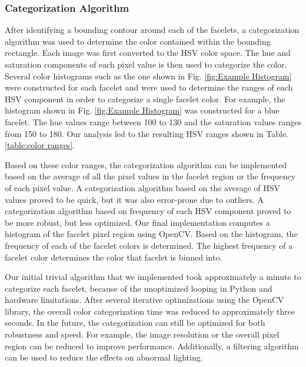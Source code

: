 \documentclass[final, letterpaper, 10 pt, conference, twocolumn]{IEEEtran}
\begin{document}
\subsubsection{Categorization Algorithm}
After identifying a bounding contour around each of the facelets, a categorization algorithm was used to determine the color contained within the bounding rectangle. Each image was first converted to the HSV color space. The hue and saturation components of each pixel value is then used to categorize the color. Several color histograms such as the one shown in Fig. \ref{fig:Example Histogram} were constructed for each facelet and were used to determine the ranges of each HSV component in order to categorize a single facelet color. For example, the histogram shown in Fig. \ref{fig:Example Histogram} was constructed for a blue facelet. The hue values range between 100 to 130 and the saturation values ranges from 150 to 180. Our analysis led to the resulting HSV ranges shown in Table. \ref{table:color ranges}.

Based on these color ranges, the categorization algorithm can be implemented based on the average of all the pixel values in the facelet region or the frequency of each pixel value. A categorization algorithm based on the average of HSV values proved to be quick, but it was also error-prone due to outliers. A categorization algorithm based on frequency of each HSV component proved to be more robust, but less optimized. Our final implementation computes a histogram of the facelet pixel region using OpenCV. Based on the histogram, the frequency of each of the facelet colors is determined. The highest frequency of a facelet color determines the color that facelet is binned into.

Our initial trivial algorithm that we implemented took approximately a minute to categorize each facelet, because of the unoptimized looping in Python and hardware limitations. After several iterative optimizations using the OpenCV library, the overall color categorization time was reduced to approximately three seconds.  In the future, the categorization can still be optimized for both robustness and speed. For example, the image resolution or the overall pixel region can be reduced to improve performance. Additionally, a filtering algorithm can be used to reduce the effects on abnormal lighting. 
\end{document}
